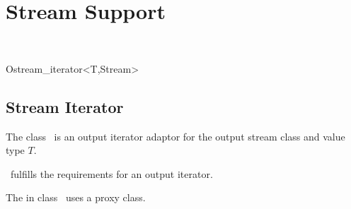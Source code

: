 
\beforecprogskip\medskipamount
\aftercprogskip\medskipamount
\ccParDims

\chapter{Stream Support}
\label{chapterStreamSupport}
\\

\begin{ccClassTemplate}{Ostream_iterator<T,Stream>}
\section{Stream Iterator}

\ccDefinition

The class \ccClassTemplateName\ is an output iterator adaptor for the
output stream class  and value type $T$.


\ccCreation
{}


\ccOperations

\ccVar\ fulfills the requirements for an output iterator.

\ccImplementation

The  in class \ccClassTemplateName\ uses a proxy class. 

\end{ccClassTemplate}

\newpage
 
